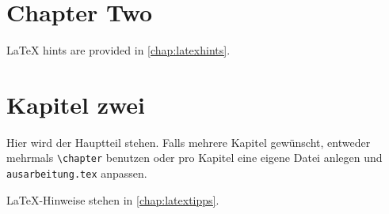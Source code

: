 \ifenglish
    \chapter{Chapter Two}
    \label{chap:k2}

    LaTeX hints are provided in \cref{chap:latexhints}.
\fi
\ifdeutsch
    \chapter{Kapitel zwei}
    \label{chap:k2}

    Hier wird der Hauptteil stehen.
    Falls mehrere Kapitel gewünscht, entweder mehrmals \texttt{\textbackslash{}chapter} benutzen oder pro Kapitel eine eigene Datei anlegen und \texttt{ausarbeitung.tex} anpassen.

    LaTeX-Hinweise stehen in \cref{chap:latextipps}.
\fi
